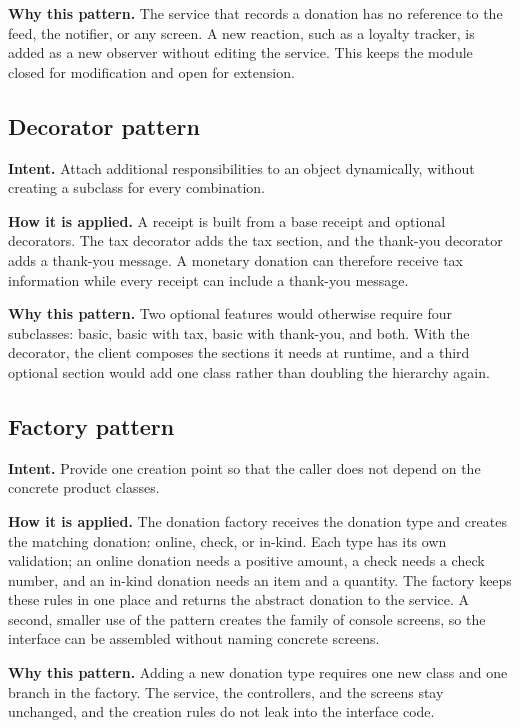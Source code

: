 \textbf{Why this pattern.} The service that records a donation has no reference to the feed, the notifier, or any screen. A new reaction, such as a loyalty tracker, is added as a new observer without editing the service. This keeps the module closed for modification and open for extension.

\subsection{Decorator pattern}

\textbf{Intent.} Attach additional responsibilities to an object dynamically, without creating a subclass for every combination.

\textbf{How it is applied.} A receipt is built from a base receipt and optional decorators. The tax decorator adds the tax section, and the thank-you decorator adds a thank-you message. A monetary donation can therefore receive tax information while every receipt can include a thank-you message.

\textbf{Why this pattern.} Two optional features would otherwise require four subclasses: basic, basic with tax, basic with thank-you, and both. With the decorator, the client composes the sections it needs at runtime, and a third optional section would add one class rather than doubling the hierarchy again.

\subsection{Factory pattern}

\textbf{Intent.} Provide one creation point so that the caller does not depend on the concrete product classes.

\textbf{How it is applied.} The donation factory receives the donation type and creates the matching donation: online, check, or in-kind. Each type has its own validation; an online donation needs a positive amount, a check needs a check number, and an in-kind donation needs an item and a quantity. The factory keeps these rules in one place and returns the abstract donation to the service. A second, smaller use of the pattern creates the family of console screens, so the interface can be assembled without naming concrete screens.

\textbf{Why this pattern.} Adding a new donation type requires one new class and one branch in the factory. The service, the controllers, and the screens stay unchanged, and the creation rules do not leak into the interface code.

